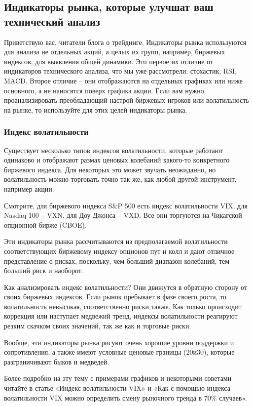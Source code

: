 \documentclass[a5paper]{article}
\begin{document}
\subsection{Индикаторы рынка, которые улучшат ваш технический анализ}

Приветствую вас, читатели блога о трейдинге. Индикаторы рынка используются для анализа не отдельных акций, а целых их групп, например, биржевых индексов, для выявления общей динамики. Это первое их отличие от индикаторов технического анализа, что мы уже рассмотрели: стохастик, RSI, MACD. Второе отличие – они отображаются на  отдельных графиках или ниже основного, а не наносятся поверх графика акции. Если вам нужно проанализировать преобладающий настрой биржевых игроков или волатильность на рынке, то используйте для этих целей индикаторы рынка.

\subsubsection{Индекс волатильности}

Существует несколько типов индексов волатильности, которые работают одинаково и отображают размах ценовых колебаний какого-то конкретного биржевого индекса. Для некоторых это может звучать неожиданно, но волатильность можно торговать точно так же, как любой другой инструмент, например акции.

Смотрите, для биржевого индекса S\&P 500 есть индекс волатильности VIX, для Nasdaq 100 – VXN, для Доу Джонса – VXD. Все они торгуются на Чикагской опционной бирже (CBOE).

Эти индикаторы рынка рассчитываются из предполагаемой волатильности
соответствующих биржевому индексу опционов пут и колл и дают отличное
представление о рисках, поскольку, чем больший диапазон колебаний, тем
больший риск и наоборот.

Как анализировать индекс волатильности? Они движутся в обратную сторону от своих биржевых индексов. Если рынок пребывает в фазе своего роста, то волатильность невысокая, соответственно риски также. Как только происходит коррекция или наступает медвежий тренд, индексы волатильности реагируют резким скачком своих значений, так же как и торговые риски.

Вообще, эти индикаторы рынка рисуют очень хорошие уровни поддержки и сопротивления, а также имеют условные ценовые границы ($20 и $30), которые разграничивают быков и медведей.

Более подробно на эту тему с примерами графиков и некоторыми советами
читайте в статье «Индекс волатильности VIX» и «Как с помощью индекса
волатильности VIX можно определить смену рыночного тренда в 70\%
случаев».
\end{document}
